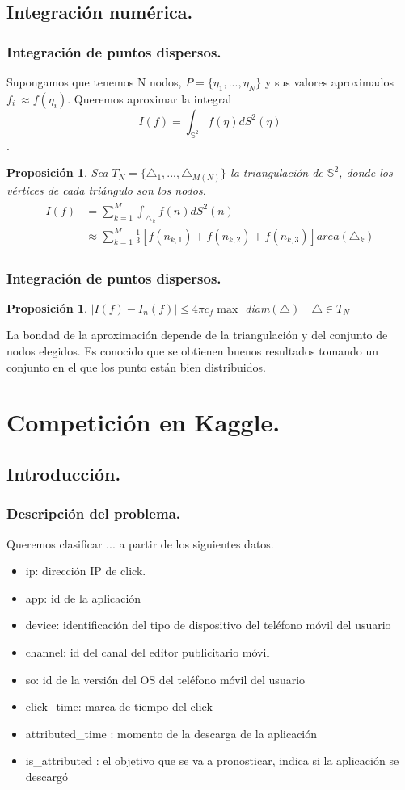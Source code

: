 \documentclass{beamer}
\theoremstyle{plain}
\theoremstyle{definition}
\theoremstyle{plain}
\newtheorem{prop}[thm]{Proposici\'{o}n}
\theoremstyle{definition}
\theoremstyle{remark}
\theoremstyle{definition}
\begin{document}
\subsection{Integración numérica.}
\begin{frame}
	\frametitle{Integración de puntos dispersos.}
	Supongamos que tenemos N nodos, $P=\{\eta_1,...,\eta_N\}$ y sus valores aproximados $f_i~\approx f(\eta_i)$. Queremos aproximar la integral $$I(f) =  \int_{\mathds{S}^2} f(\eta)dS^2(\eta)$$.
	\begin{prop}
		Sea $T_N=\{\triangle_1,...,\triangle_{M(N)}\}$ la triangulación de $\mathds{S}^2$, donde los vértices de cada triángulo son los nodos.
		\begin{gather*}
		\begin{aligned}
			I(f) &= \sum_{k=1}^{M} \int_{\triangle_k} f(n)dS^2(n) \\& \approx  \sum_{k=1}^{M} \frac{1}{3}[f(n_{k,1})+f(n_{k,2})+f(n_{k,3})] area(\triangle_k)
		\end{aligned}
		\end{gather*}
	\end{prop}
\end{frame}
\begin{frame}
		\frametitle{Integración de puntos dispersos.}
		\begin{prop}
			$|I(f)-I_n(f)|\le 4\pi c_f \max$ diam$(\triangle) \quad \triangle\in T_N$
		\end{prop}
	La bondad de la aproximación depende de la triangulación y del conjunto de nodos elegidos.
	Es conocido que se obtienen buenos resultados tomando un conjunto en el que los punto están bien distribuidos.
\end{frame}
\section{Competición en Kaggle.}
\subsection{Introducción.}
\begin{frame}
	\frametitle{Descripción del problema.}
	Queremos clasificar ... a partir de los siguientes datos.
\begin{itemize}
	
	\item ip: dirección IP de click.
	\item app: id de la aplicación
	\item device: identificación del tipo de dispositivo del teléfono móvil del usuario
	\item channel: id del canal del editor publicitario móvil
	\item so: id de la versión del OS del teléfono móvil del usuario
	\item click\_time: marca de tiempo del click 
	\item attributed\_time : momento de la descarga de la aplicación 
	\item is\_attributed : el objetivo que se va a pronosticar, indica si la aplicación se descargó
\end{itemize}
\end{frame}
\end{document}

